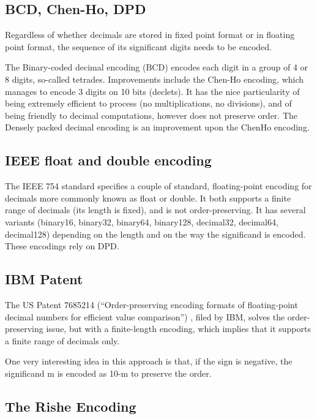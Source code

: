 \documentclass{acm_proc_article-sp}
\begin{document}
\subsection{BCD, Chen-Ho, DPD}

Regardless of whether decimals are stored in fixed point format or in floating point format, the sequence of its significant digits needs to be encoded.

The Binary-coded decimal encoding (BCD) encodes each digit in a group of 4 or 8 digits, so-called tetrades. Improvements include the Chen-Ho \cite{ChenHo} encoding, which manages to encode 3 digits on 10 bits (declets). It has the nice particularity of being extremely efficient to process (no multiplications, no divisions), and of being friendly to decimal computations, however does not preserve order. The Densely packed decimal encoding \cite{DPD} is an improvement upon the ChenHo encoding.

\subsection{IEEE float and double encoding}

The IEEE 754 standard specifies a couple of standard, floating-point encoding for decimals more commonly known as float or double. It both supports a finite range of decimals (its length is fixed), and is not order-preserving. It has several variants (binary16, binary32, binary64, binary128, decimal32, decimal64, decimal128) depending on the length and on the way the significand is encoded. These encodings rely on DPD.

\subsection{IBM Patent}
The US Patent 7685214 (``Order-preserving encoding formats of floating-point decimal numbers for efficient value comparison'') , filed by IBM, solves the order-preserving issue, but with a finite-length encoding, which implies that it supports a finite range of decimals only.

One very interesting idea in this approach is that, if the sign is negative, the significand m is encoded as 10-m to preserve the order.

\subsection{The Rishe Encoding}
\label{section-rishe}
\end{document}
